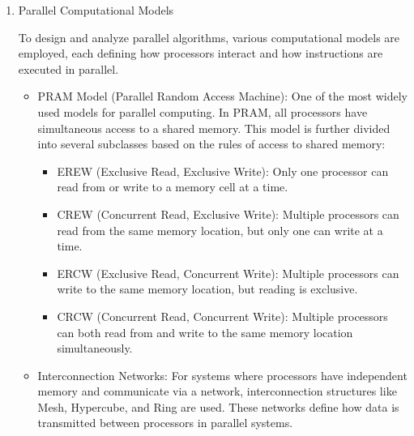 \documentclass[a4paper, 10pt]{book}
\begin{document}
        \begin{enumerate}
            
            \item {\bold Parallel Computational Models}
            
                To design and analyze parallel algorithms, various computational models are employed, each defining how processors interact and how instructions are executed in parallel.

                \begin{itemize}
                    
                    \item {\bold PRAM Model (Parallel Random Access Machine):} One of the most widely used models for parallel computing. In PRAM, all processors have simultaneous access to a shared memory. This model is further divided into several subclasses based on the rules of access to shared memory:
                    
                    \begin{itemize}
                        
                        \item {\bold EREW (Exclusive Read, Exclusive Write):} Only one processor can read from or write to a memory cell at a time.
                        
                        \item {\bold CREW (Concurrent Read, Exclusive Write):} Multiple processors can read from the same memory location, but only one can write at a time.

                        \item {\bold ERCW (Exclusive Read, Concurrent Write):} Multiple processors can write to the same memory location, but reading is exclusive.

                        \item {\bold CRCW (Concurrent Read, Concurrent Write):} Multiple processors can both read from and write to the same memory location simultaneously.

                    \end{itemize}

                    \item {\bold Interconnection Networks:} For systems where processors have independent memory and communicate via a network, interconnection structures like Mesh, Hypercube, and Ring are used. These networks define how data is transmitted between processors in parallel systems.


\end{itemize}
\end{enumerate}
\end{document}
